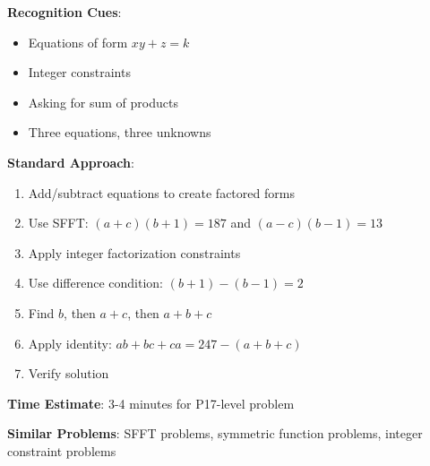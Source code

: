 \documentclass[12pt]{article}
\begin{document}
\textbf{Recognition Cues}:
\begin{itemize}
    \item Equations of form $xy + z = k$
    \item Integer constraints
    \item Asking for sum of products
    \item Three equations, three unknowns
\end{itemize}

\textbf{Standard Approach}:
\begin{enumerate}
    \item Add/subtract equations to create factored forms
    \item Use SFFT: $(a+c)(b+1) = 187$ and $(a-c)(b-1) = 13$
    \item Apply integer factorization constraints
    \item Use difference condition: $(b+1) - (b-1) = 2$
    \item Find $b$, then $a+c$, then $a+b+c$
    \item Apply identity: $ab+bc+ca = 247 - (a+b+c)$
    \item Verify solution
\end{enumerate}

\textbf{Time Estimate}: 3-4 minutes for P17-level problem

\textbf{Similar Problems}: SFFT problems, symmetric function problems, integer constraint problems
\end{document}
